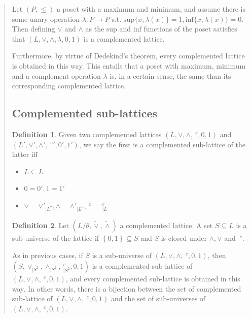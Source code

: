 \documentclass[a4paper, 12pt]{article}
\theoremstyle{definition}
\theoremstyle{definition}
\theoremstyle{definition}
\newtheorem{definition}{Definition}
\begin{document}
\begin{quote}
\begin{quote}
\end{quote}
\normalsize

Let $(P, \leq)$ a poset with a maximum and minimum, and assume there is some
unary operation $\lambda : P \to P$ s.t. $\text{sup}\{x, \lambda(x)\}  = 1,
\text{inf}\{x, \lambda(x)\} = 0 $. Then defining $\lor$ and $\land$ as the
$\text{sup}$ and $\text{inf}$ functions of the poset satisfies that $(L, \lor,
\land, \lambda, 0, 1)$ is a complemented lattice.

Furthermore, by virtue of Dedekind's theorem, every complemented lattice is
obtained in this way. This entails that a poset with maximum, minimum and a
complement operation $\lambda$ is, in a certain sense, the same than its
corresponding complemented lattice.

\subsection{Complemented sub-lattices}

\begin{definition}
    Given two complemented lattices $(L, \lor, \land, ~^c, 0, 1)$ and $(L',
    \lor', \land', ~^c', 0', 1')$, we say the first is a complemented
    sub-lattice of the latter iff

    \begin{itemize}
        \item $L \subseteq L  $
        \item $0 = 0', 1 = 1'$
        \item $\lor  = \lor'_{\mid L^2}, \land = \land'_{\mid L^2}, ~^c = ~^c_{\mid L}$
    \end{itemize}
\end{definition}

\begin{definition}
    Let $(L / \theta, \widetilde{\lor}, \widetilde{\land})$ a complemented
    lattice. A set $S \subseteq L$ is a sub-universe of the lattice if $\left\{
    0,1 \right\}\subseteq  S $ and $S$ is closed under $\land , \lor $ and
    $~^c$.
\end{definition}

As in previous cases, if $S$ is a sub-universe of $(L, \lor, \land, ~^c, 0,
1)$, then $(S, \lor_{| S^2}, \land_{|S^2}, ~^c_{|S^2}, 0, 1)$ is a complemented
sub-lattice of $(L, \lor, \land, ~^c, 0, 1)$, and every complemented
sub-lattice is obtained in this way. In other words, there is a bijection
between the set of complemented sub-lattice of $(L, \lor, \land, ~^c, 0, 1)$
and the set of sub-universes of $(L, \lor, \land, ~^c, 0, 1)$.


\end{quote}
\end{document}
